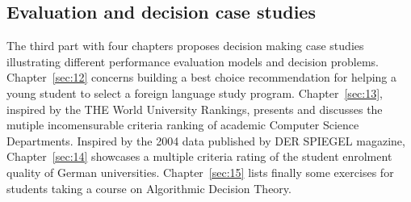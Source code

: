 % 
%
%

\begin{partbacktext}
\part{Evaluation and decision case studies}
\noindent The third part with four chapters proposes decision making case studies illustrating different performance evaluation models and decision problems. Chapter~\ref{sec:12} concerns building a best choice recommendation for helping a young student to select a foreign language study program. Chapter~\ref{sec:13}, inspired by the THE World University Rankings, presents and discusses the mutiple incomensurable criteria ranking of academic Computer Science Departments. Inspired by the 2004 data published by DER SPIEGEL magazine, Chapter~\ref{sec:14} showcases a multiple criteria rating of the student enrolment quality of German universities. Chapter~\ref{sec:15} lists finally some exercises for students taking a course on Algorithmic Decision Theory. 
\end{partbacktext}